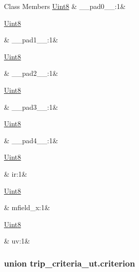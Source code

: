 \begin{DoxyFields}{Class Members}
\hypertarget{a00003_a74a47a7eac047138ff811ede153943e6}{\hyperlink{a00001_a979e3e23b9a449e69ab6a8a83b6042f8}{Uint8}}\label{a00003_a74a47a7eac047138ff811ede153943e6}
&
\+\_\+\+\_\+pad0\+\_\+\+\_\+\+:1&
\\
\hline

\hypertarget{a00003_abb67792e94e88254ca5afecf7c26c912}{\hyperlink{a00001_a979e3e23b9a449e69ab6a8a83b6042f8}{Uint8}}\label{a00003_abb67792e94e88254ca5afecf7c26c912}
&
\+\_\+\+\_\+pad1\+\_\+\+\_\+\+:1&
\\
\hline

\hypertarget{a00003_a2780c6c77e1f937563d98e2f517c2aeb}{\hyperlink{a00001_a979e3e23b9a449e69ab6a8a83b6042f8}{Uint8}}\label{a00003_a2780c6c77e1f937563d98e2f517c2aeb}
&
\+\_\+\+\_\+pad2\+\_\+\+\_\+\+:1&
\\
\hline

\hypertarget{a00003_ad30f3f7ff6b12f7b97db2c89403b4238}{\hyperlink{a00001_a979e3e23b9a449e69ab6a8a83b6042f8}{Uint8}}\label{a00003_ad30f3f7ff6b12f7b97db2c89403b4238}
&
\+\_\+\+\_\+pad3\+\_\+\+\_\+\+:1&
\\
\hline

\hypertarget{a00003_a72d43dbd74859e7e4034c3a0b841b13b}{\hyperlink{a00001_a979e3e23b9a449e69ab6a8a83b6042f8}{Uint8}}\label{a00003_a72d43dbd74859e7e4034c3a0b841b13b}
&
\+\_\+\+\_\+pad4\+\_\+\+\_\+\+:1&
\\
\hline

\hypertarget{a00003_ad74eea4899a61f9fcbc527ef988ea0ff}{\hyperlink{a00001_a979e3e23b9a449e69ab6a8a83b6042f8}{Uint8}}\label{a00003_ad74eea4899a61f9fcbc527ef988ea0ff}
&
ir\+:1&
\\
\hline

\hypertarget{a00003_a46709d870ad5c3126599a53675c43291}{\hyperlink{a00001_a979e3e23b9a449e69ab6a8a83b6042f8}{Uint8}}\label{a00003_a46709d870ad5c3126599a53675c43291}
&
mfield\+\_\+x\+:1&
\\
\hline

\hypertarget{a00003_a45210da832f9626829457a65e9e7c4d0}{\hyperlink{a00001_a979e3e23b9a449e69ab6a8a83b6042f8}{Uint8}}\label{a00003_a45210da832f9626829457a65e9e7c4d0}
&
uv\+:1&
\\
\hline

\end{DoxyFields}
\label{d2/d82/a00142}
\hypertarget{a00003_d2/d82/a00142}{}
\subsubsection{union trip\+\_\+criteria\+\_\+ut.\+criterion}



